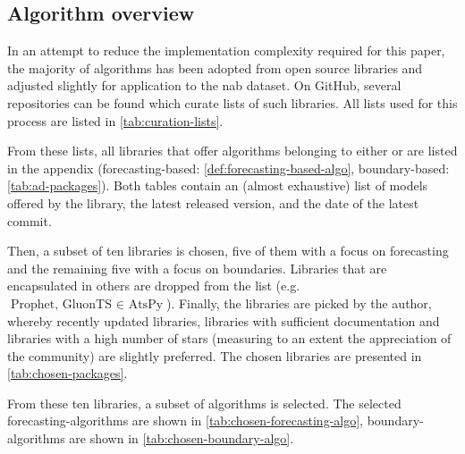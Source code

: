 \subsection{Algorithm overview}
In an attempt to reduce the implementation complexity required for this paper,
the majority of algorithms has been adopted from open source libraries and
adjusted slightly for application to the \gls{nab} dataset. On GitHub, several
repositories can be found which curate lists of such libraries. All lists used
for this process are listed in \cref{tab:curation-lists}.

From these lists, all libraries that offer algorithms belonging to either
 or 
are listed in the appendix (forecasting-based: \cref{def:forecasting-based-algo},
boundary-based: \cref{tab:ad-packages}). Both tables contain an (almost exhaustive)
list of models offered by the library, the latest released version, and the date
of the latest commit.

Then, a subset of ten libraries is chosen, five of them with a focus on forecasting
and the remaining five with a focus on boundaries. Libraries that are encapsulated
in others are dropped from the list (e.g.\ \(\text{Prophet, GluonTS } \in \text{ AtsPy}\)).
Finally, the libraries are picked by the author, whereby recently updated libraries,
libraries with sufficient documentation and libraries with a high number of
stars (measuring to an extent the appreciation of the community) are slightly
preferred. The chosen libraries are presented in \cref{tab:chosen-packages}.

From these ten libraries, a subset of algorithms is selected. The selected
forecasting-algorithms are shown in \cref{tab:chosen-forecasting-algo},
boundary-algorithms are shown in \cref{tab:chosen-boundary-algo}.

